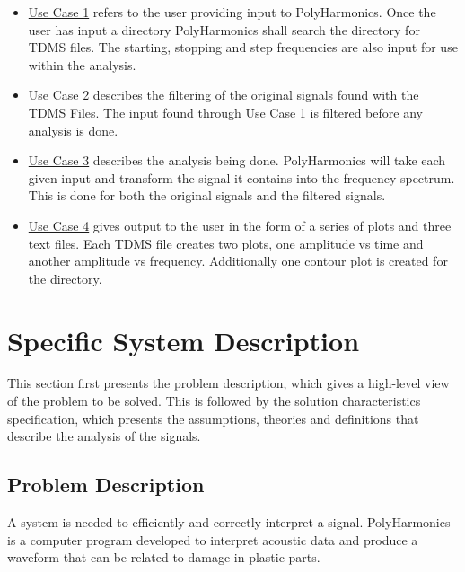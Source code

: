 \documentclass[12pt]{article}
\newcommand{\progname}{PolyHarmonics}
\begin{document}
\begin{itemize}
\item \hyperref[UC_InputFile]{Use Case 1}
 refers to the user providing input
 to \progname{}. Once the user has input a directory 
\progname{} shall search the directory for TDMS files. The starting, stopping
and step frequencies are also input for use within the analysis.

\item \hyperref[UC_Filter]{Use Case 2} describes the filtering of the original
 signals found with the TDMS Files. The input found through
 \hyperref[UC_InputFile]{Use Case 1} is filtered before any analysis is done.

\item \hyperref[UC_AnalyzeInput]{Use Case 3} describes the analysis being
  done. \progname{} will take each given input and transform the signal it
  contains into the frequency spectrum. This is done for both the original
  signals and the filtered signals.

\item \hyperref[UC_PlotTrans]{Use Case 4} gives output to the user in the form
  of a series of plots and three text files. Each TDMS file creates two plots, 
one amplitude vs time and another amplitude vs frequency. Additionally 
one contour plot is created for the directory.
\end{itemize}

\section{Specific System Description}

This section first presents the problem description, which gives a high-level
view of the problem to be solved.  This is followed by the solution
characteristics specification, which presents the assumptions, theories and
definitions that describe the analysis of the signals.

\subsection{Problem Description} \label{Sec_pd}

A system is needed to efficiently and correctly interpret a signal. \progname{}
is a computer program developed to interpret acoustic data and produce a
waveform that can be related to damage in plastic parts.

\end{document}
